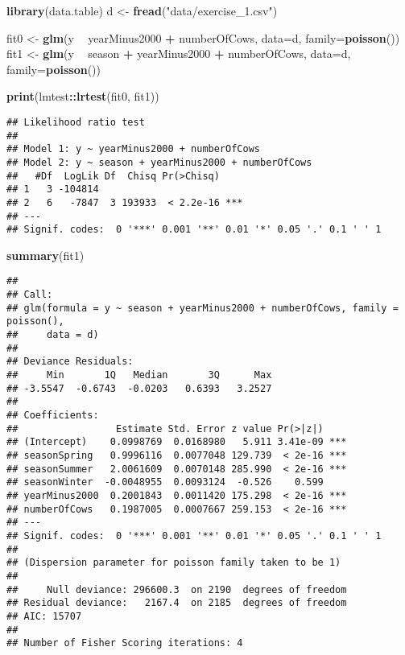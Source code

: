 \documentclass[]{book}
\newenvironment{Shaded}{\begin{snugshade}}{\end{snugshade}}
\newcommand{\KeywordTok}[1]{\textcolor[rgb]{0.13,0.29,0.53}{\textbf{#1}}}
\newcommand{\DataTypeTok}[1]{\textcolor[rgb]{0.13,0.29,0.53}{#1}}
\newcommand{\StringTok}[1]{\textcolor[rgb]{0.31,0.60,0.02}{#1}}
\newcommand{\OperatorTok}[1]{\textcolor[rgb]{0.81,0.36,0.00}{\textbf{#1}}}
\newcommand{\NormalTok}[1]{#1}
\begin{document}
\begin{Shaded}
\begin{Highlighting}[]
\KeywordTok{library}\NormalTok{(data.table)}
\NormalTok{d <-}\StringTok{ }\KeywordTok{fread}\NormalTok{(}\StringTok{"data/exercise_1.csv"}\NormalTok{)}

\NormalTok{fit0 <-}\StringTok{ }\KeywordTok{glm}\NormalTok{(y }\OperatorTok{~}\StringTok{ }\NormalTok{yearMinus2000 }\OperatorTok{+}\StringTok{ }\NormalTok{numberOfCows, }\DataTypeTok{data=}\NormalTok{d, }\DataTypeTok{family=}\KeywordTok{poisson}\NormalTok{())}
\NormalTok{fit1 <-}\StringTok{ }\KeywordTok{glm}\NormalTok{(y }\OperatorTok{~}\StringTok{ }\NormalTok{season }\OperatorTok{+}\StringTok{ }\NormalTok{yearMinus2000 }\OperatorTok{+}\StringTok{ }\NormalTok{numberOfCows, }\DataTypeTok{data=}\NormalTok{d, }\DataTypeTok{family=}\KeywordTok{poisson}\NormalTok{())}

\KeywordTok{print}\NormalTok{(lmtest}\OperatorTok{::}\KeywordTok{lrtest}\NormalTok{(fit0, fit1))}
\end{Highlighting}
\end{Shaded}

\begin{verbatim}
## Likelihood ratio test
## 
## Model 1: y ~ yearMinus2000 + numberOfCows
## Model 2: y ~ season + yearMinus2000 + numberOfCows
##   #Df  LogLik Df  Chisq Pr(>Chisq)    
## 1   3 -104814                         
## 2   6   -7847  3 193933  < 2.2e-16 ***
## ---
## Signif. codes:  0 '***' 0.001 '**' 0.01 '*' 0.05 '.' 0.1 ' ' 1
\end{verbatim}

\begin{Shaded}
\begin{Highlighting}[]
\KeywordTok{summary}\NormalTok{(fit1)}
\end{Highlighting}
\end{Shaded}

\begin{verbatim}
## 
## Call:
## glm(formula = y ~ season + yearMinus2000 + numberOfCows, family = poisson(), 
##     data = d)
## 
## Deviance Residuals: 
##     Min       1Q   Median       3Q      Max  
## -3.5547  -0.6743  -0.0203   0.6393   3.2527  
## 
## Coefficients:
##                 Estimate Std. Error z value Pr(>|z|)    
## (Intercept)    0.0998769  0.0168980   5.911 3.41e-09 ***
## seasonSpring   0.9996116  0.0077048 129.739  < 2e-16 ***
## seasonSummer   2.0061609  0.0070148 285.990  < 2e-16 ***
## seasonWinter  -0.0048955  0.0093124  -0.526    0.599    
## yearMinus2000  0.2001843  0.0011420 175.298  < 2e-16 ***
## numberOfCows   0.1987005  0.0007667 259.153  < 2e-16 ***
## ---
## Signif. codes:  0 '***' 0.001 '**' 0.01 '*' 0.05 '.' 0.1 ' ' 1
## 
## (Dispersion parameter for poisson family taken to be 1)
## 
##     Null deviance: 296600.3  on 2190  degrees of freedom
## Residual deviance:   2167.4  on 2185  degrees of freedom
## AIC: 15707
## 
## Number of Fisher Scoring iterations: 4
\end{verbatim}
\end{document}
